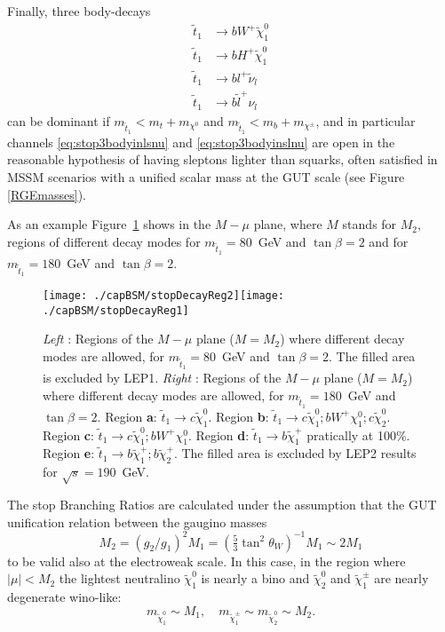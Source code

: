 Finally, three body-decays \cite{djouadi-2001-63} \begin{align}
\tilde{t}_1 &\rightarrow b W^+ \tilde \chi^0_{1} \label{eq:stop3bodyinW}\\
\tilde{t}_1 &\rightarrow b H^+ \tilde \chi^0_{1} \label{eq:stop3bodyinH}\\
\tilde{t}_1 &\rightarrow b l^+ \tilde \nu_{l} \label{eq:stop3bodyinlsnu}\\
\tilde{t}_1 &\rightarrow b \tilde l^+ \nu_{l} \label{eq:stop3bodyinslnu}
\end{align} can be dominant if $m_{\tilde{t}_1} < m_t + m_{\chi^0}$ and $m_{\tilde{t}_1} < m_b + m_{\chi^\pm}$, and in particular channels \ref{eq:stop3bodyinlsnu} and  \ref{eq:stop3bodyinslnu} are open in the reasonable hypothesis of having sleptons lighter than squarks, often satisfied in MSSM scenarios with a unified scalar mass at the GUT scale (see Figure \ref{RGEmasses}).

As an example Figure~\ref{stopDecayReg1} shows in the $M-\mu$ plane, where $M$ stands for $M_2$, regions of different decay modes for $m_{\tilde t_1} = 80$~GeV and $\tan\beta=2$ and for $m_{\tilde t_1} = 180$~GeV and $\tan\beta=2$.
\begin{figure}[htb]\begin{center}
\texttt{[image: ./capBSM/stopDecayReg2]}\texttt{[image: ./capBSM/stopDecayReg1]}\caption{\textit{Left} \cite{bartl-1997-73}: Regions of the $M-\mu$ plane ($M=M_2$) where different decay modes are allowed, for $m_{\tilde t_1} = 80$~GeV and $\tan\beta=2$. The filled area is excluded by LEP1. \textit{Right} \cite{bartl-1997-76}: Regions of the $M-\mu$ plane ($M=M_2$) where different decay modes are allowed, for $m_{\tilde t_1} = 180$~GeV and $\tan\beta=2$. Region \textbf{a}: $\tilde{t}_1 \rightarrow c \tilde \chi^0_1$. Region \textbf{b}: $\tilde{t}_1 \rightarrow c \tilde \chi^0_1; b W^+ \chi^0_1; c \tilde \chi^0_2$. Region \textbf{c}: $\tilde{t}_1 \rightarrow c \tilde \chi^0_1; b W^+ \chi^0_1$. Region \textbf{d}: $\tilde{t}_1 \rightarrow b \tilde \chi^+_1$ pratically at 100\%. Region \textbf{e}: $\tilde{t}_1 \rightarrow b \tilde \chi^+_1; b \tilde \chi^+_2$. The filled area is excluded by LEP2 results for $\sqrt{s}=190$~GeV. }\label{stopDecayReg1}\end{center}\end{figure} The stop Branching Ratios are calculated under the assumption that the GUT unification relation between the gaugino masses\begin{equation}\label{eq:GUTmassRel}
M_2 = (g_2/g_1)^2 M_1 = (\tfrac{5}{3}\tan^2\theta_W)^{-1} M_1\sim 2M_1
\end{equation}to be valid also at the electroweak scale. In this case, in the region where $|\mu| < M_2$ the lightest neutralino $\tilde\chi_1^0$ is nearly a bino and $\tilde\chi_2^0$ and $\tilde\chi_1^\pm$ are nearly degenerate wino-like: \begin{equation}
m_{\tilde\chi_1^0}\sim M_1, \quad m_{\tilde\chi_1^\pm}\sim m_{\tilde\chi_2^0}\sim M_2.
\end{equation}


